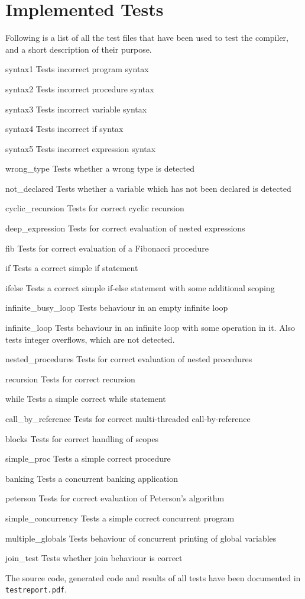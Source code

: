 \documentclass[twoside]{report}
\newenvironment{mycompactdesc}{\begin{adjustwidth}{0.53cm}{}\begin{compactdesc}}{\end{compactdesc}\end{adjustwidth}}
\begin{document}
\section{Implemented Tests}
\label{implemented_tests}
Following is a list of all the test files that have been used to test the compiler, and a short description of their purpose.
\begin{mycompactdesc}
	\item[syntax1] Tests incorrect program syntax
	\item[syntax2] Tests incorrect procedure syntax
	\item[syntax3] Tests incorrect variable syntax
	\item[syntax4] Tests incorrect if syntax
	\item[syntax5] Tests incorrect expression syntax
	\item[wrong\_{}type] Tests whether a wrong type is detected
	\item[not\_{}declared] Tests whether a variable which has not been declared is detected
    \item[cyclic\_{}recursion] Tests for correct cyclic recursion
    \item[deep\_{}expression] Tests for correct evaluation of nested expressions
    \item[fib] Tests for correct evaluation of a Fibonacci procedure 
    \item[if] Tests a correct simple if statement
    \item[ifelse] Tests a correct simple if-else statement with some additional scoping
    \item[infinite\_{}busy\_{}loop] Tests behaviour in an empty infinite loop
    \item[infinite\_{}loop] Tests behaviour in an infinite loop with some operation in it. Also tests integer overflows, which are not detected.
    \item[nested\_{}procedures] Tests for correct evaluation of nested procedures
    \item[recursion] Tests for correct recursion
    \item[while] Tests a simple correct while statement
    \item[call\_{}by\_{}reference] Tests for correct multi-threaded call-by-reference
    \item[blocks] Tests for correct handling of scopes
    \item[simple\_{}proc] Tests a simple correct procedure
	\item[banking] Tests a concurrent banking application
    \item[peterson] Tests for correct evaluation of Peterson's algorithm
    \item[simple\_{}concurrency] Tests a simple correct concurrent program
    \item[multiple\_{}globals] Tests behaviour of concurrent printing of global variables
    \item[join\_{}test] Tests whether join behaviour is correct
\end{mycompactdesc}
The source code, generated code and results of all tests have been documented in \texttt{testreport.pdf}.
\end{document}
